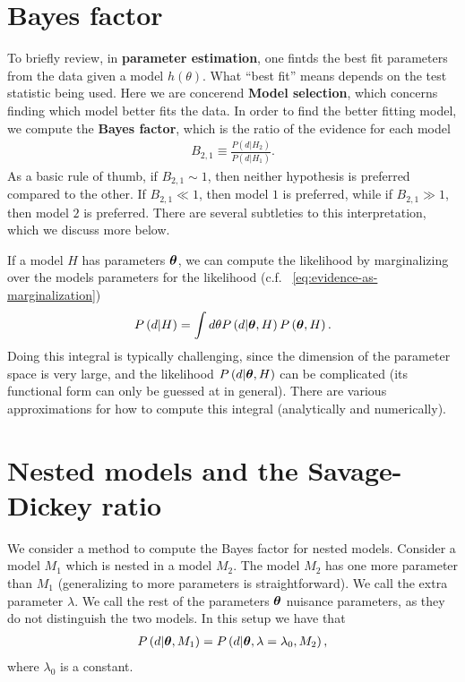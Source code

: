 \section{Bayes factor}

To briefly review, in \textbf{parameter estimation}, 
one fintds the best fit parameters from the data given a model $h\left(\theta\right)$.
What ``best fit'' means depends on the test statistic being used. 
Here we are concerend \textbf{Model selection}, which concerns finding which
model better fits the data.
In order to find the better fitting model, we compute the \textbf{Bayes factor},
which is the ratio of the evidence for each model 
\begin{align}
    \label{eq:def-Bayes-factor}
    B_{2,1}
    \equiv
    \frac{P\left(d|H_2\right)}{P\left(d|H_1\right)}
    .
\end{align}
As a basic rule of thumb, if $B_{2,1}\sim1$, then neither hypothesis is preferred
compared to the other.
If $B_{2,1}\ll1$, then model $1$ is preferred, while if $B_{2,1}\gg1$, then model $2$ is preferred.
There are several subtleties to this interpretation, which we discuss more below.

If a model $H$ has parameters ${\bm \theta}$, we can compute the likelihood 
by marginalizing over the models parameters for the likelihood
(c.f. ~\eqref{eq:evidence-as-marginalization})
\begin{align}
    P\left(d|H\right)
    =
    \int d\theta P\left(d|{\bm \theta},H\right) P\left({\bm \theta},H\right)
    .
\end{align}
Doing this integral is typically challenging, since the dimension of the
parameter space is very large, and the likelihood $P\left(d|{\bm \theta},H\right)$
can be complicated (its functional form can only be guessed at in general).
There are various approximations for how to 
compute this integral (analytically and numerically).

\section{Nested models and the Savage-Dickey ratio}

We consider a method to compute the Bayes factor for nested models. 
Consider a model $M_1$ which is nested in a model $M_2$.
The model $M_2$ has one more parameter than $M_1$ 
(generalizing to more parameters is straightforward).
We call the extra parameter $\lambda$.
We call the rest of the parameters ${\bm \theta}$ nuisance parameters,
as they do not distinguish the two models. 
In this setup we have that
\begin{align}
    P\left(d|{\bm \theta},M_1\right)
    =
    P\left(d|{\bm \theta},\lambda=\lambda_0,M_2\right)
    ,
\end{align}
where $\lambda_0$ is a constant.

